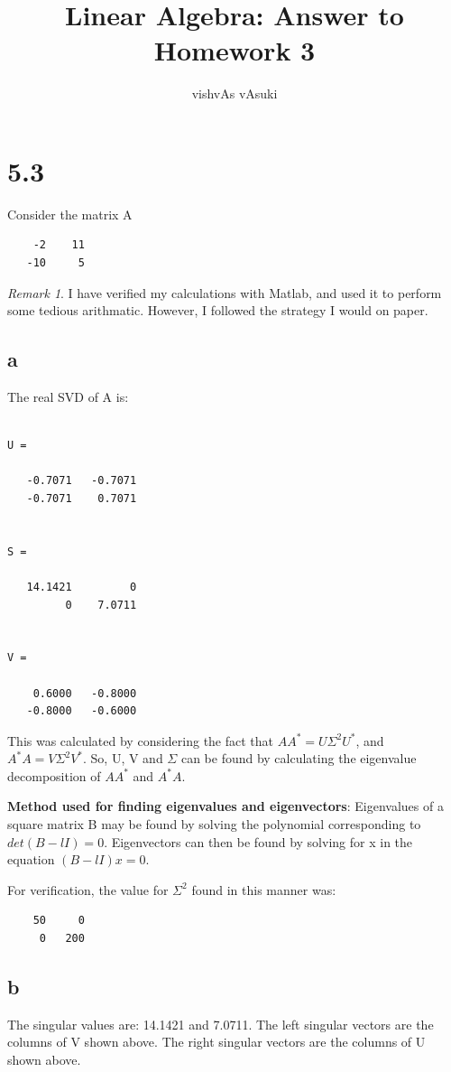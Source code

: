 \documentclass[10pt]{amsart}
\title{Linear Algebra: Answer to Homework 3}
\author{vishvAs vAsuki}
\theoremstyle{remark}
\newtheorem{rem}[thm]{Remark}
\begin{document}
\maketitle

\section{5.3}
 Consider the matrix A 
\begin{verbatim}
    -2    11
   -10     5
\end{verbatim}

\begin{rem}
I have verified my calculations with Matlab, and used it to perform some tedious arithmatic. However, I followed the strategy I would on paper.
\end{rem}

\subsection{a}
The real SVD of A is:
\begin{verbatim}

U =

   -0.7071   -0.7071
   -0.7071    0.7071


S =

   14.1421         0
         0    7.0711


V =

    0.6000   -0.8000
   -0.8000   -0.6000

\end{verbatim}

This was calculated by considering the fact that $AA^{*} = U \Sigma^{2}U^{*}$, and $A^{*}A = V \Sigma^{2}V^{*}$. So, U, V and $\Sigma$ can be found by calculating the eigenvalue decomposition of $AA^{*}$ and $A^{*}A$.

\textbf{Method used for finding eigenvalues and eigenvectors}: Eigenvalues of a square matrix B may be found by solving the polynomial corresponding to $det(B-lI) = 0$. Eigenvectors can then be found by solving for x in the equation $(B-lI)x = 0$.

For verification, the value for $\Sigma^{2}$ found in this manner was:
\begin{verbatim}
    50     0
     0   200
\end{verbatim}

\subsection{b}
The singular values are: 14.1421 and 7.0711.
The left singular vectors are the columns of V shown above.
The right singular vectors are the columns of U shown above.
\end{document}
